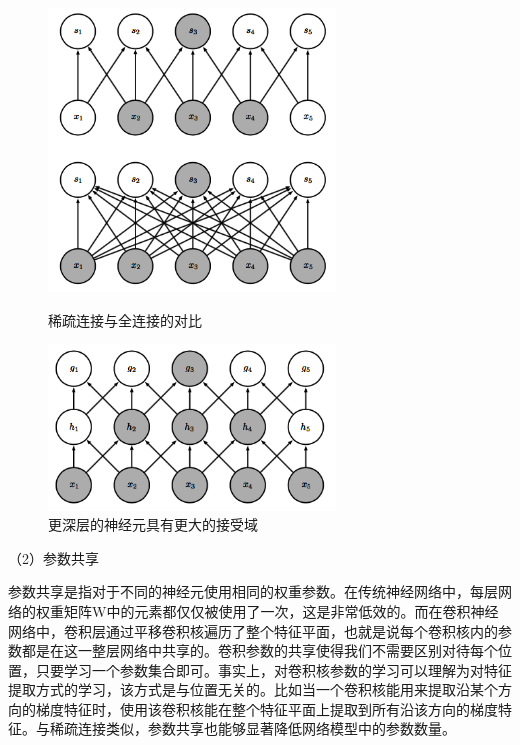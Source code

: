 \begin{figure}[htb] %
	\centering
	\begin{minipage}[c]{0.48\textwidth}
		\centering
		\includegraphics[width=3in]{figures/3_1_稀疏连接与全连接的对比}
		\caption{稀疏连接与全连接的对比}
	\end{minipage}
	\hfill
	\begin{minipage}[c]{0.48\textwidth}
		\centering
		\includegraphics[width=3in]{figures/3_1_更深层的神经元具有更大的接受域}
		\caption{更深层的神经元具有更大的接受域}
	\end{minipage}
\end{figure}

（2）参数共享

参数共享是指对于不同的神经元使用相同的权重参数。在传统神经网络中，每层网络的权重矩阵W中的元素都仅仅被使用了一次，这是非常低效的。而在卷积神经网络中，卷积层通过平移卷积核遍历了整个特征平面，也就是说每个卷积核内的参数都是在这一整层网络中共享的。卷积参数的共享使得我们不需要区别对待每个位置，只要学习一个参数集合即可。事实上，对卷积核参数的学习可以理解为对特征提取方式的学习，该方式是与位置无关的。比如当一个卷积核能用来提取沿某个方向的梯度特征时，使用该卷积核能在整个特征平面上提取到所有沿该方向的梯度特征。与稀疏连接类似，参数共享也能够显著降低网络模型中的参数数量。

